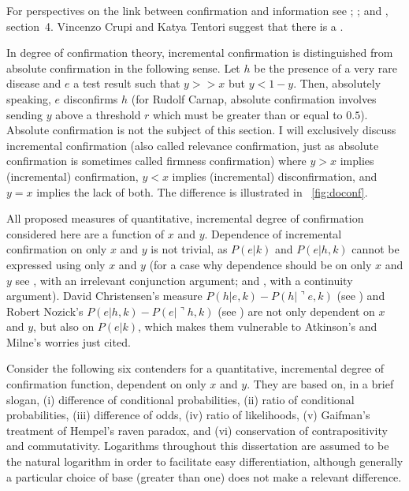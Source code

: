 \documentclass[phd,12pt,oneside]{ubcthesis}
\begin{document}
For perspectives on the link between confirmation and information see
; ; and
, section~4. Vincenzo Crupi and Katya Tentori
suggest that there is a  . 

In degree of confirmation theory, incremental confirmation is
distinguished from absolute confirmation in the following sense. Let
$h$ be the presence of a very rare disease and $e$ a test result such
that $y>>x$ but $y<1-y$. Then, absolutely speaking, $e$ disconfirms
$h$ (for Rudolf Carnap, absolute confirmation involves sending $y$
above a threshold $r$ which must be greater than or equal to $0.5$).
Absolute confirmation is not the subject of this section. I will
exclusively discuss incremental confirmation (also called relevance
confirmation, just as absolute confirmation is sometimes called
firmness confirmation) where $y>x$ implies (incremental) confirmation,
$y<x$ implies (incremental) disconfirmation, and $y=x$ implies the
lack of both. The difference is illustrated in
{\igure}~\ref{fig:doconf}.

All proposed measures of quantitative, incremental degree of
confirmation considered here are a function of $x$ and $y$. Dependence
of incremental confirmation on only $x$ and $y$ is not trivial, as
$P(e|k)$ and $P(e|h,k)$ cannot be expressed using only $x$ and $y$
(for a case why dependence should be on only $x$ and $y$ see
, with an irrelevant conjunction argument;
and , with a continuity argument). David
Christensen's measure $P(h|e,k)-P(h|\urcorner{}e,k)$ (see
) and Robert Nozick's
$P(e|h,k)-P(e|\urcorner{}h,k)$ (see ) are not
only dependent on $x$ and $y$, but also on $P(e|k)$, which makes them
vulnerable to Atkinson's and Milne's worries just cited.

Consider the following six contenders for a quantitative, incremental
degree of confirmation function, dependent on only $x$ and $y$. They
are based on, in a brief slogan, (i) difference of conditional
probabilities, (ii) ratio of conditional probabilities, (iii)
difference of odds, (iv) ratio of likelihoods, (v) Gaifman's treatment
of Hempel's raven paradox, and (vi) conservation of contrapositivity
and commutativity. Logarithms throughout this dissertation are assumed
to be the natural logarithm in order to facilitate easy
differentiation, although generally a particular choice of base
(greater than one) does not make a relevant difference.
\end{document}
